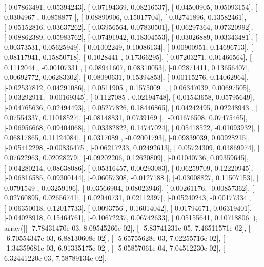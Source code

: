 \documentclass{article}
\begin{document}
       [ 0.07863491,  0.05394243],
       [-0.07194369,  0.08216537],
       [-0.04500905,  0.05093154],
       [ 0.0304967 ,  0.0858877 ],
       [ 0.08890906,  0.15017704],
       [-0.02741896,  0.13582461],
       [-0.05152816,  0.03637262],
       [ 0.03956564,  0.07830501],
       [-0.06297364,  0.07320992],
       [-0.08862389,  0.05983762],
       [ 0.07491942,  0.18304553],
       [ 0.03026889,  0.03343481],
       [ 0.00373531,  0.05625949],
       [ 0.01002249,  0.10086134],
       [-0.00900951,  0.14696713],
       [ 0.08117941,  0.15850718],
       [ 0.1028441 ,  0.17366295],
       [-0.07203271,  0.01466564],
       [ 0.1112044 , -0.00107331],
       [ 0.08941607,  0.08310053],
       [-0.02871411,  0.13656407],
       [ 0.00692772,  0.06283302],
       [-0.08090631,  0.15394853],
       [ 0.00115276,  0.14062964],
       [-0.02537812,  0.04291086],
       [ 0.0511905 ,  0.1575009 ],
       [ 0.06347039,  0.00697505],
       [-0.03292911, -0.00169345],
       [ 0.1127085 ,  0.02194748],
       [-0.01543658,  0.05795649],
       [-0.04765636,  0.02494493],
       [ 0.05277826,  0.18446865],
       [ 0.04242495,  0.02248943],
       [ 0.07554337,  0.11018527],
       [-0.08148831,  0.0739169 ],
       [-0.01676508,  0.07475465],
       [-0.06956668,  0.09404068],
       [ 0.03382822,  0.14747024],
       [ 0.05418522, -0.01093932],
       [ 0.06817865,  0.11124084],
       [ 0.0317089 , -0.02001793],
       [-0.09839039,  0.00928215],
       [-0.05412298, -0.00836475],
       [-0.06217233,  0.02492613],
       [ 0.05724309,  0.01869974],
       [ 0.07622963,  0.02028279],
       [-0.09202206,  0.12620809],
       [-0.01040736,  0.09359645],
       [-0.04280214,  0.08638086],
       [ 0.05316457,  0.00293083],
       [-0.06259709,  0.12220945],
       [-0.06816585,  0.09300144],
       [-0.06057308, -0.0127188 ],
       [-0.03008827,  0.11507153],
       [ 0.0791549 ,  0.03259196],
       [-0.03566904,  0.08023946],
       [-0.00261176, -0.00857362],
       [ 0.02760895,  0.02656741],
       [ 0.02940731,  0.02112397],
       [-0.05240243, -0.00177334],
       [-0.06350018,  0.12017733],
       [-0.0093756 ,  0.16014042],
       [ 0.01794671,  0.06319401],
       [-0.04028918,  0.15464761],
       [-0.10672237,  0.06742633],
       [ 0.05155641,  0.10718806]]), array([[ -7.78431470e-03,   8.09545266e-02],
       [ -5.83741231e-05,   7.46511571e-02],
       [ -6.70554347e-03,   6.88130608e-02],
       [ -5.65755628e-03,   7.02255716e-02],
       [ -1.34359681e-03,   6.91335175e-02],
       [ -5.05857061e-04,   7.04512230e-02],
       [  6.32441220e-03,   7.58789134e-02],
\end{document}
